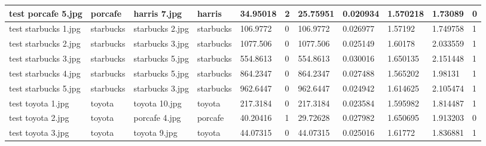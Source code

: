 \begin{landscape}
\begin{longtable}{|p{2cm}|p{1.5cm}|p{2cm}|p{1.5cm}|p{2cm}|p{1cm}|p{2cm}|p{2cm}|p{2cm}|p{2cm}|p{1cm}|}
		test porcafe 5.jpg   & porcafe          & harris 7.jpg          & harris                      & 34.95018              & 2                       & 25.75951                   & 0.020934              & 1.570218              & 1.73089                  & 0                \\ \hline
		test starbucks 1.jpg & starbucks        & starbucks 2.jpg       & starbucks                   & 106.9772              & 0                       & 106.9772                   & 0.026977              & 1.57192               & 1.749758                 & 1                \\ \hline
		test starbucks 2.jpg & starbucks        & starbucks 3.jpg       & starbucks                   & 1077.506              & 0                       & 1077.506                   & 0.025149              & 1.60178               & 2.033559                 & 1                \\ \hline
		test starbucks 3.jpg & starbucks        & starbucks 5.jpg       & starbucks                   & 554.8613              & 0                       & 554.8613                   & 0.030016              & 1.650135              & 2.151448                 & 1                \\ \hline
		test starbucks 4.jpg & starbucks        & starbucks 5.jpg       & starbucks                   & 864.2347              & 0                       & 864.2347                   & 0.027488              & 1.565202              & 1.98131                  & 1                \\ \hline
		test starbucks 5.jpg & starbucks        & starbucks 3.jpg       & starbucks                   & 962.6447              & 0                       & 962.6447                   & 0.024942              & 1.614625              & 2.105474                 & 1                \\ \hline
		test toyota 1.jpg    & toyota           & toyota 10.jpg         & toyota                      & 217.3184              & 0                       & 217.3184                   & 0.023584              & 1.595982              & 1.814487                 & 1                \\ \hline
		test toyota 2.jpg    & toyota           & porcafe 4.jpg         & porcafe                     & 40.20416              & 1                       & 29.72628                   & 0.027982              & 1.650695              & 1.913203                 & 0                \\ \hline
		test toyota 3.jpg    & toyota           & toyota 9.jpg          & toyota                      & 44.07315              & 0                       & 44.07315                   & 0.025016              & 1.61772               & 1.836881                 & 1                \\ \hline

\end{longtable}
\end{landscape}
